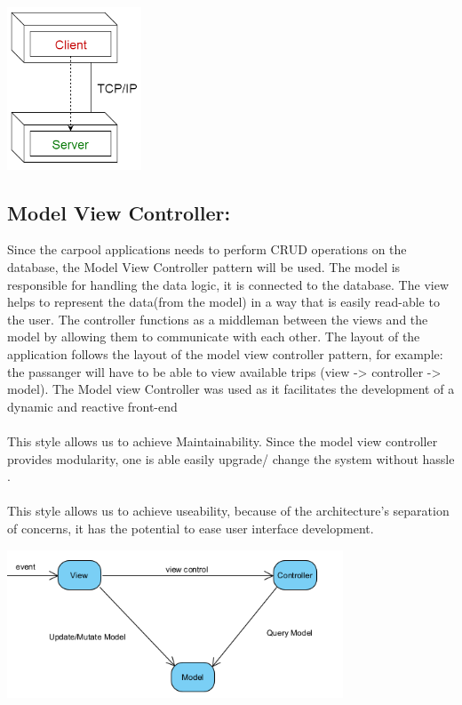 \documentclass[hidelinks, 12pt, a4paper]{article}
\begin{document}
\begin{center}
    \noindent
    \includegraphics[width=4cm]{images/client_server.png}
    \vspace{0.5cm}
\end{center}
\subsection{\textbf{Model View Controller:}}
\newline
Since the carpool applications needs to perform CRUD operations on  the database, the Model View Controller pattern will be used. The model is responsible for handling the data logic, it is connected to the database. The view helps to represent the data(from the model) in a way that is easily read-able to the user. The controller functions as a middleman between the views and the model by allowing them to communicate with each other.
The layout of the application follows the layout of the model view controller pattern, for example: the passanger will have to be able to view available trips (view -> controller -> model).
The Model view Controller was used as it facilitates the development of a dynamic and reactive front-end  \\ \\
This style allows us to achieve Maintainability. Since the model view controller provides modularity, one is able easily upgrade/ change the system without hassle  .\\ \\
This style allows us to achieve useability, because of the architecture's separation of concerns, it has the potential to ease user interface development.
 \vspace{0.2cm}
\begin{center}
    \noindent
    \includegraphics[width=10cm]{images/model_view_controller.png}
    \vspace{0.5cm}
\end{center}
\end{document}
